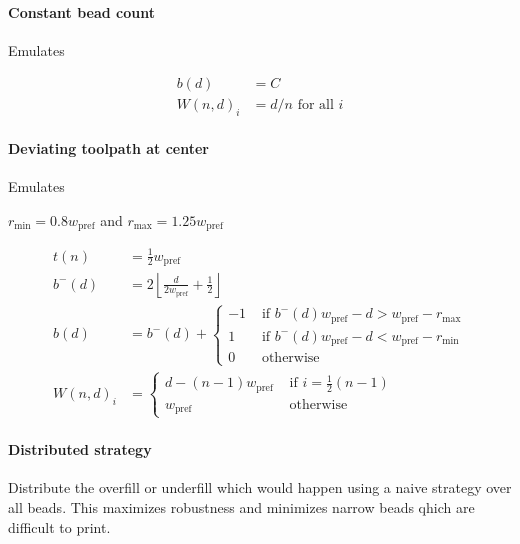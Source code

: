 \paragraph{Constant bead count}
Emulates \cite{Ding2016a}

\begin{align*}
b(d) &= C \\
W(n,d)_i &= d / n \text{ for all } i 
\end{align*}

\paragraph{Deviating toolpath at center}
Emulates \cite{Jin2017}

$r_\text{min} = 0.8 w_\text{pref}$ and $r_\text{max} = 1.25 w_\text{pref}$

\begin{align*}
t(n) &= \frac12 w_\text{pref} \\
b^-(d) &= 2 \left\lfloor \frac{d}{ 2w_\text{pref}} + \frac12 \right\rfloor \\
b(d) &= b^-(d) +
\begin{cases}
-1 & \text{ if } b^-(d) w_\text{pref} - d > w_\text{pref} - r_\text{max} \\
1  & \text{ if }  b^-(d) w_\text{pref} - d < w_\text{pref} - r_\text{min} \\
0 & \text{ otherwise}
\end{cases}
\\
W(n,d)_i &= 
\begin{cases}
d - (n-1) w_\text{pref} &\text{ if } i = \frac12 (n-1) \\
w_\text{pref} &\text{ otherwise }
\end{cases}
\end{align*}





\paragraph{Distributed strategy}
Distribute the overfill or underfill which would happen using a naive strategy over all beads.
This maximizes robustness and minimizes narrow beads qhich are difficult to print.


